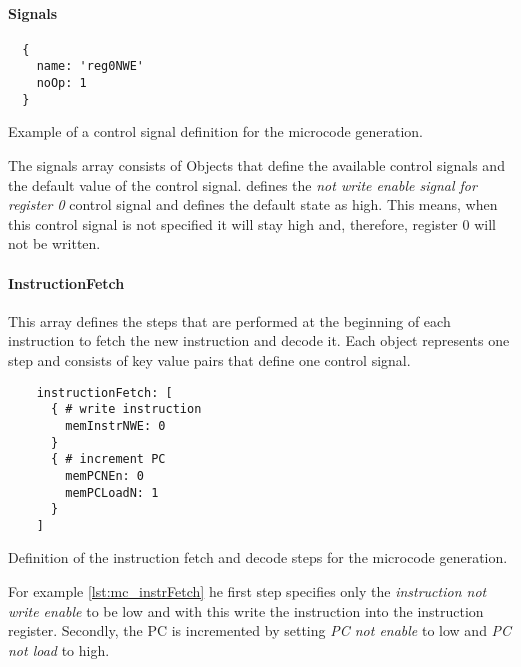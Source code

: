 \paragraph{Signals}
\begin{listing}[h!]
  \begin{verbatim}
  {
    name: 'reg0NWE'
    noOp: 1
  }
  \end{verbatim}
  \caption{Example of a control signal definition for the microcode generation.}
  \label{lst:mc_signals}
\end{listing}
The signals array consists of Objects that define the available control signals and the default value of the control signal.
defines the \emph{not write enable signal for register 0} control signal and defines the default state as high.
This means, when this control signal is not specified it will stay high and, therefore, register 0 will not be written.

\paragraph{InstructionFetch} This array defines the steps that are performed at the beginning of each instruction to fetch the new instruction and decode it.
Each object represents one step and consists of key value pairs that define one control signal.
\begin{listing}[h!]
  \begin{verbatim}
    instructionFetch: [
      { # write instruction
        memInstrNWE: 0
      }
      { # increment PC
        memPCNEn: 0
        memPCLoadN: 1
      }
    ]
  \end{verbatim}
  \caption{Definition of the instruction fetch and decode steps for the microcode generation.}
  \label{lst:mc_instrFetch}
\end{listing}

For example \cref{lst:mc_instrFetch} he first step specifies only the \emph{instruction not write enable} to be low and with this write the instruction into the instruction register.
Secondly, the \gls{PC} is incremented by setting \emph{PC not enable} to low and \emph{PC not load} to high.
